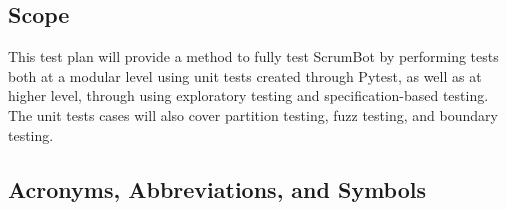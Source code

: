 \documentclass[12pt, titlepage]{article}
\begin{document}
\subsection{Scope}
This test plan will provide a method to fully test ScrumBot by performing tests both at a modular level using unit tests created through Pytest, as well as at higher level, through using exploratory testing and specification-based testing. The unit tests cases will also cover partition testing, fuzz testing, and boundary testing.

\subsection{Acronyms, Abbreviations, and Symbols}
	
\end{document}
